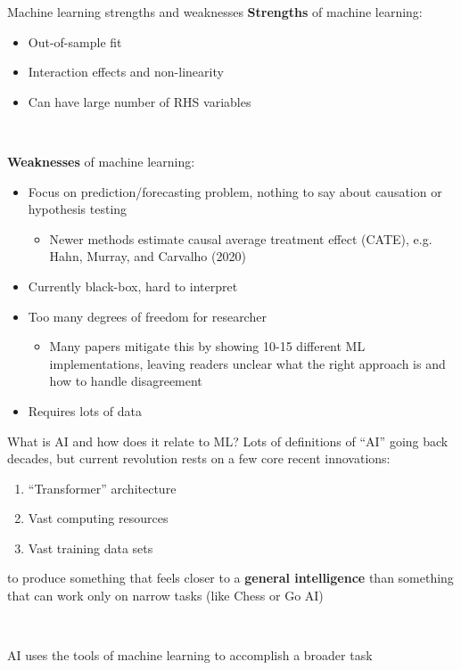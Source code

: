 \documentclass[xcolor=table, aspectratio=169]{beamer}
\newcommand{\alertbf}[1]{\alert{\textbf{#1}}}
\begin{document}
\begin{frame}{Machine learning strengths and weaknesses}
    \alertbf{Strengths} of machine learning:
\begin{itemize}
    \item Out-of-sample fit
    \item Interaction effects and non-linearity 
    \item Can have large number of RHS variables
\end{itemize}

~

\alertbf{Weaknesses} of machine learning:
\begin{itemize}
    \item Focus on prediction/forecasting problem, nothing to say about causation or hypothesis testing
    \begin{itemize}
        \item Newer methods estimate causal average treatment effect (CATE), e.g. Hahn, Murray, and Carvalho (2020)
    \end{itemize}
    \item Currently black-box, hard to interpret
    \item Too many degrees of freedom for researcher
    \begin{itemize}
        \item Many papers mitigate this by showing 10-15 different ML implementations, leaving readers unclear what the right approach is and how to handle disagreement
    \end{itemize}
    \item Requires lots of data
\end{itemize}
\end{frame}

\begin{frame}{What is AI and how does it relate to ML?}
    Lots of definitions of ``AI'' going back decades, but current revolution rests on a few core recent innovations:
    \begin{enumerate}
        \item ``Transformer'' architecture
        \item Vast computing resources
        \item Vast training data sets
    \end{enumerate}
    to produce something that feels closer to a \alertbf{general intelligence} than something that can work only on narrow tasks (like Chess or Go AI)

    ~

    AI uses the tools of machine learning to accomplish a broader task
    
\end{frame}
\end{document}
